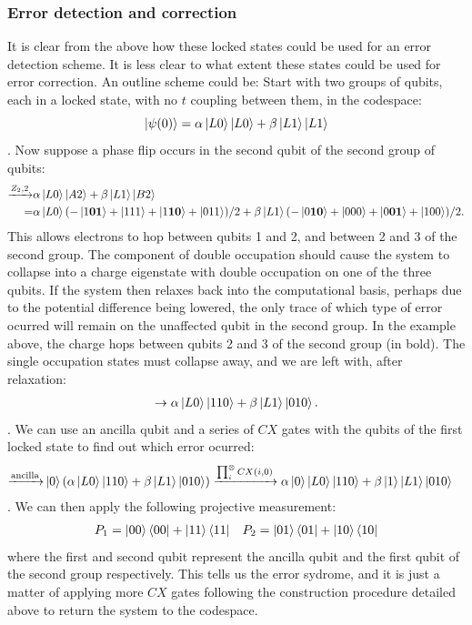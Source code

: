 \documentclass{report}
\begin{document}
\begin{appendices}
\subsubsection{Error detection and correction}
It is clear from the above how these locked states could be used for an error detection scheme. It is less clear to what extent these states could be used for error correction. An outline scheme could be:
Start with two groups of qubits, each in a locked state, with no $t$ coupling between them, in the codespace:
\begin{equation*}
    \ket{\psi(0)} = \alpha\ket{L0}\ket{L0} + \beta\ket{L1}\ket{L1}
\end{equation*}. Now suppose a phase flip occurs in the second qubit of the second group of qubits:
\begin{align*}
    \xrightarrow{Z_2,2} &\alpha\ket{L0}\ket{A2} + \beta\ket{L1}\ket{B2}\\
    =&\alpha\ket{L0}(-\ket{1\mathbf{01}} + \ket{111} + \ket{1\mathbf{10}}+\ket{011})/2 + \beta\ket{L1}(-\ket{0\mathbf{10}} + \ket{000} + \ket{0\mathbf{01}}+\ket{100})/2.
\end{align*}
This allows electrons to hop between qubits 1 and 2, and between 2 and 3 of the second group. The component of double occupation should cause the system to collapse into a charge eigenstate with double occupation on one of the three qubits. If the system then relaxes back into the computational basis, perhaps due to the potential difference being lowered, the only trace of which type of error ocurred will remain on the unaffected qubit in the second group. In the example above, the charge hops between qubits 2 and 3 of the second group (in bold). The single occupation states must collapse away, and we are left with, after relaxation:
\begin{align*}
    \rightarrow\alpha\ket{L0}\ket{110} + \beta\ket{L1}\ket{010}.
\end{align*}. We can use an ancilla qubit and a series of $CX$ gates with the qubits of the first locked state to find out which error ocurred:
\begin{align*}
    \xrightarrow{\text{ancilla}} & \ket{0}(\alpha\ket{L0}\ket{110} + \beta\ket{L1}\ket{010})
    \xrightarrow{\prod_i^\otimes CX(i,0)}\alpha\ket{0}\ket{L0}\ket{110} + \beta\ket{1}\ket{L1}\ket{010}
\end{align*}. We can then apply the following projective measurement:
\begin{align*}
    P_1 = \ket{00}\bra{00} + \ket{11}\bra{11} && P_2 = \ket{01}\bra{01} + \ket{10}\bra{10}
\end{align*}
where the first and second qubit represent the ancilla qubit and the first qubit of the second group respectively. This tells us the error sydrome, and it is just a matter of applying more $CX$ gates following the construction procedure detailed above to return the system to the codespace.


\end{appendices}
\end{document}
